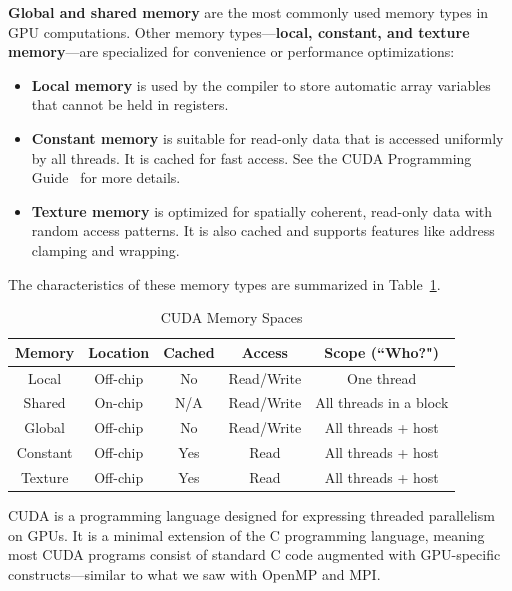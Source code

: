\documentclass[12pt]{book}
\begin{document}
\textbf{Global and shared memory} are the most commonly used memory types in GPU computations. Other memory types—\textbf{local, constant, and texture memory}—are specialized for convenience or performance optimizations:

\begin{itemize}
    \item \textbf{Local memory} is used by the compiler to store automatic array variables that cannot be held in registers.
    \item \textbf{Constant memory} is suitable for read-only data that is accessed uniformly by all threads. It is cached for fast access. See the CUDA Programming Guide~\cite{nvidia2011nvidia} for more details.
    \item \textbf{Texture memory} is optimized for spatially coherent, read-only data with random access patterns. It is also cached and supports features like address clamping and wrapping.
\end{itemize}

The characteristics of these memory types are summarized in Table~\ref{tab:cuda_memoryspaces}.


\begin{table}[ht]
    \centering
    \begin{tabular}{|c|c|c|c|c|}
    \hline
        \textbf{Memory} & \textbf{Location} & \textbf{Cached} & \textbf{Access} & \textbf{Scope (``Who?")} \\
        \hline
        Local & Off-chip & No & Read/Write & One thread \\
        \hline 
        Shared & On-chip & N/A & Read/Write & All threads in a block \\
        \hline
        Global & Off-chip & No & Read/Write & All threads + host \\
        \hline 
        Constant & Off-chip & Yes & Read & All threads + host \\
        \hline
        Texture & Off-chip & Yes & Read & All threads + host \\
        \hline
    \end{tabular}
    \caption{CUDA Memory Spaces}
    \label{tab:cuda_memoryspaces}
\end{table}

\vspace{1em}

CUDA is a programming language designed for expressing threaded parallelism on GPUs. It is a minimal extension of the C programming language, meaning most CUDA programs consist of standard C code augmented with GPU-specific constructs—similar to what we saw with OpenMP and MPI.
\end{document}
